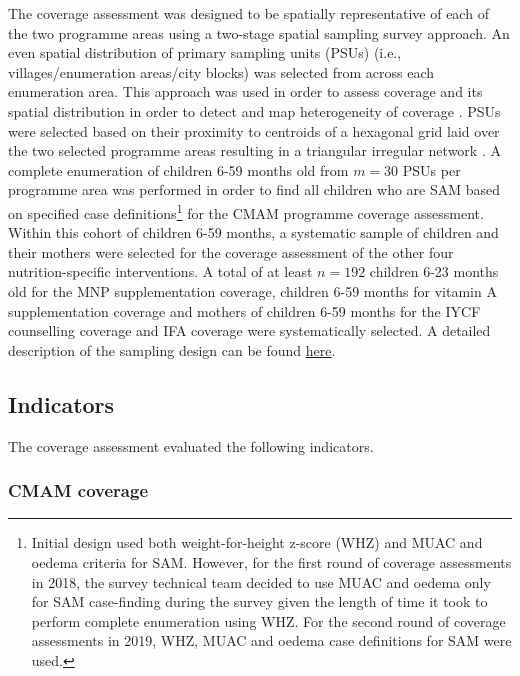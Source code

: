 \documentclass[12pt,a4paper]{article}
\let\rmarkdownfootnote\footnote%
\def\footnote{\protect\rmarkdownfootnote}
\begin{document}
The coverage assessment was designed to be spatially representative of each of the two programme areas using a two-stage spatial sampling survey approach. An even spatial distribution of primary sampling units (PSUs) (i.e., villages/enumeration areas/city blocks) was selected from across each enumeration area. This approach was used in order to assess coverage and its spatial distribution in order to detect and map heterogeneity of coverage \citep{Elliott:2004cg, Diggle:2014tk}. PSUs were selected based on their proximity to centroids of a hexagonal grid laid over the two selected programme areas resulting in a triangular irregular network \citep{Isaaks:1989uk, Elliot:2000vs}. A complete enumeration of children 6-59 months old from \(m = 30\) PSUs per programme area was performed in order to find all children who are SAM based on specified case definitions\footnote{Initial design used both weight-for-height z-score (WHZ) and MUAC and oedema criteria for SAM. However, for the first round of coverage assessments in 2018, the survey technical team decided to use MUAC and oedema only for SAM case-finding during the survey given the length of time it took to perform complete enumeration using WHZ. For the second round of coverage assessments in 2019, WHZ, MUAC and oedema case definitions for SAM were used.} for the CMAM programme coverage assessment. Within this cohort of children 6-59 months, a systematic sample of children and their mothers were selected for the coverage assessment of the other four nutrition-specific interventions. A total of at least \(n = 192\) children 6-23 months old for the MNP supplementation coverage, children 6-59 months for vitamin A supplementation coverage and mothers of children 6-59 months for the IYCF counselling coverage and IFA coverage were systematically selected. A detailed description of the sampling design can be found \href{https://validmeasures.org/liberiaS3M/}{here}.

\hypertarget{indicators}{%
\subsection{Indicators}\label{indicators}}

The coverage assessment evaluated the following indicators.

\hypertarget{cmam-coverage}{%
\subsubsection{CMAM coverage}\label{cmam-coverage}}
\end{document}

